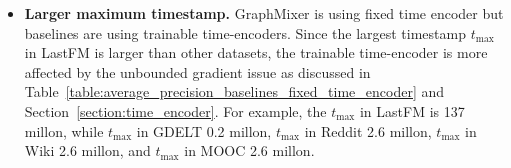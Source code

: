 \begin{itemize} [noitemsep,topsep=0pt,leftmargin=5mm ]
    \item \textbf{Larger maximum timestamp.} GraphMixer is using fixed time encoder but baselines are using trainable time-encoders. Since the largest timestamp $t_{\max}$ in LastFM is larger than other datasets, the trainable time-encoder is more affected by the unbounded gradient issue as discussed in Table~\ref{table:average_precision_baselines_fixed_time_encoder} and Section~\ref{section:time_encoder}. For example, the $t_{\max}$ in LastFM is 137 millon, while $t_{\max}$ in GDELT 0.2 millon, $t_{\max}$ in Reddit 2.6 millon, $t_{\max}$ in Wiki 2.6 millon, and $t_{\max}$ in MOOC 2.6 millon.
\end{itemize}
